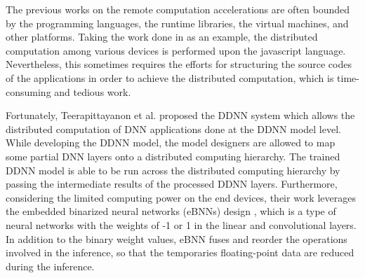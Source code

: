 \documentclass[format=acmsmall, review=false, screen=true]{acmart}
\begin{document}
%

The previous works on the remote computation accelerations are often bounded by the programming languages, the runtime libraries, the virtual machines, and other platforms. Taking the work done in \cite{Tseng15} as an example, the distributed computation among various devices is performed upon the javascript language. Nevertheless, this sometimes requires the efforts for structuring the source codes of the applications in order to achieve the distributed computation, which is time-consuming and tedious work.

Fortunately, Teerapittayanon et al. \cite{Teerapittayanon17} proposed the DDNN system which allows the distributed computation of DNN applications done at the DDNN model level. While developing the DDNN model, the model designers are allowed to map some partial DNN layers onto a distributed computing hierarchy. The trained DDNN model is able to be run across the distributed computing hierarchy by passing the intermediate results of the processed DDNN layers.
Furthermore, considering the limited computing power on the end devices, their work leverages the embedded binarized neural networks (eBNNs) design \cite{McDanel17}, which is a type of neural networks with the weights of -1 or 1 in the linear and convolutional layers. In addition to the binary weight values, eBNN fuses and reorder the operations involved in the inference, so that the temporaries floating-point data are reduced during the inference.
\end{document}
